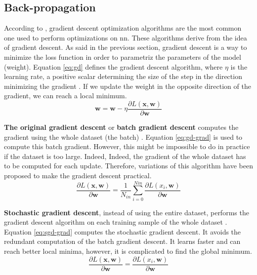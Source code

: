 \subsection{Back-propagation} \label{subs:trainbackward}
According to \textcite{ruder_overview_2017}, gradient descent optimization algorithms are the most common one used  to perform optimizations on \acrshort{nn}. These algorithms derive from the idea of gradient descent. As said in the previous section, gradient descent is a way to minimize the loss function in order to parametriz the parameters of the model (weight). Equation \eqref{eq:gd} defines the gradient descent algorithm, where $\eta$ is the learning rate, a positive scalar determining the size of the step in the direction minimizing the gradient \cite{ruder_overview_2017, goodfellow_deep_2016}. If we update the weight in the opposite direction of the gradient, we can reach a local minimum.
%
\begin{equation}
    \boldsymbol{w} = \boldsymbol{w} - \eta \frac{ \partial L( \boldsymbol{x}, \boldsymbol{w} ) }{\partial \boldsymbol{w}}
    \label{eq:gd}
\end{equation}

\textbf{The original gradient descent} or \textbf{batch gradient descent} computes the gradient using the whole dataset (the batch) \cite{ruder_overview_2017, matteucci_artificial_2019}. Equation \eqref{eq:gd-grad} is used to compute this batch gradient. However, this might be impossible to do in practice if the dataset is too large. Indeed, Indeed, the gradient of the whole dataset has to be computed for each update. Therefore, variations of this algorithm have been proposed to make the gradient descent practical.
%
\begin{equation}
    \frac{ \partial L( \boldsymbol{x}, \boldsymbol{w} ) }{\partial \boldsymbol{w}} = \frac{1}{N_{in}} \sum^{Nin}_{i = 0} \frac{ \partial L( x_i, \boldsymbol{w} ) }{\partial \boldsymbol{w}}
    \label{eq:gd-grad}
\end{equation}

\textbf{Stochastic gradient descent}, instead of using the entire dataset, performs the gradient descent algorithm on each training sample of the whole dataset \cite{ruder_overview_2017, matteucci_artificial_2019}. Equation \eqref{eq:sgd-grad} computes the stochastic gradient descent. It avoids the redundant computation of the batch gradient descent. It learns faster and can reach better local minima, however, it is complicated to find the global minimum.
%
\begin{equation}
    \frac{ \partial L( \boldsymbol{x}, \boldsymbol{w} ) }{\partial \boldsymbol{w}} = \frac{ \partial L( x_i, \boldsymbol{w} ) }{\partial \boldsymbol{w}}
    \label{eq:sgd-grad}
\end{equation}

